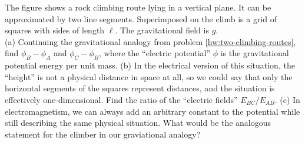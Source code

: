 The figure shows a rock climbing route lying in a vertical plane.
It can be approximated by two line segments. Superimposed on the climb
is a grid of squares with sides of length $\ell$. The gravitational field
is $g$.\\
(a) Continuing the gravitational
analogy from problem \ref{hw:two-climbing-routes}, find
$\phi_B-\phi_A$ and $\phi_C-\phi_B$, where the ``electric potential''
$\phi$ is the gravitational potential energy per unit mass.\answercheck\hwendpart
(b) In the electrical version of this situation, the ``height'' is
not a physical distance in space at all, so we could say that
only the horizontal segments of the squares represent
distances, and the situation is effectively one-dimensional.
Find the ratio of the ``electric fields'' $E_{BC}/E_{AB}$.\answercheck\hwendpart
(c) In electromagnetism, we can always add an arbitrary constant to
the potential while still describing the same physical situation.
What would be the analogous statement for the climber in our graviational
analogy?
